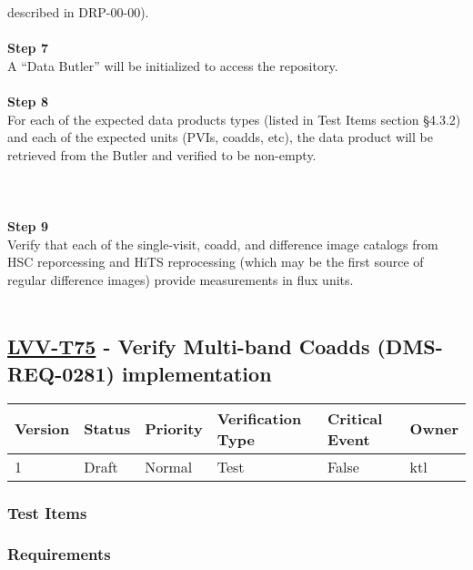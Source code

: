 described in DRP-00-00).\\
~\\
\textbf{Step 7}\\
A ``Data Butler'' will be initialized to access the repository.\\
~\\
\textbf{Step 8}\\
For each of the expected data products types (listed in Test Items
section §4.3.2) and each of the expected units (PVIs, coadds, etc), the
data product will be retrieved from the Butler and verified to be
non-empty.\\
~\\
~\\
~\\
\textbf{Step 9}\\
Verify that each of the single-visit, coadd, and difference image
catalogs from HSC reporcessing and HiTS reprocessing (which may be the
first source of regular difference images) provide measurements in flux
units.\\
~\\

\hypertarget{lvv-t75---verify-multi-band-coadds-dms-req-0281-implementation}{%
\subsection{\texorpdfstring{\href{https://jira.lsstcorp.org/secure/Tests.jspa\#/testCase/LVV-T75}{LVV-T75}
- Verify Multi-band Coadds (DMS-REQ-0281)
implementation}{LVV-T75 - Verify Multi-band Coadds (DMS-REQ-0281) implementation}}\label{lvv-t75---verify-multi-band-coadds-dms-req-0281-implementation}}

\begin{longtable}[]{@{}llllll@{}}
\toprule
Version & Status & Priority & Verification Type & Critical Event &
Owner\tabularnewline
\midrule
\endhead
1 & Draft & Normal & Test & False & ktl\tabularnewline
\bottomrule
\end{longtable}

\hypertarget{test-items-23}{%
\subsubsection{Test Items}\label{test-items-23}}

\hypertarget{requirements-46}{%
\subsubsection{Requirements}\label{requirements-46}}

